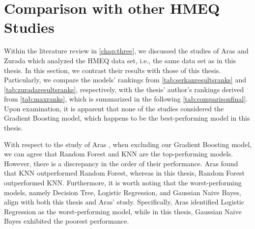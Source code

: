 \newpage
\section{Comparison with other HMEQ Studies}
\label{sec:comparisonfinal}
Within the literature review in \autoref{chap:three}, we discussed the studies of Aras \citep{serkan2021bagging} and Zurada \citep{zurada2014classification} which analyzed the HMEQ data set, i.e., the same data set as in this thesis.
In this section, we contrast their results with those of this thesis. Particularly, we compare the models' rankings from \autoref{tab:serkanresultsranks} and \autoref{tab:zuradaresultsranks}, respectively, with the thesis' author's rankings derived from \autoref{tab:maxranks}, which is summarized in the following \autoref{tab:comparisonfinal}.
Upon examination, it is apparent that none of the studies considered the Gradient Boosting model, which happens to be the best-performing model in this thesis.

With respect to the study of Aras \citep{serkan2021bagging}, when excluding our Gradient Boosting model, we can agree that Random Forest and KNN are the top-performing models. However, there is a discrepancy in the order of their performance. Aras found that KNN outperformed Random Forest, whereas in this thesis, Random Forest outperformed KNN.
Furthermore, it is worth noting that the worst-performing models, namely Decision Tree, Logistic Regression, and Gaussian Naive Bayes, align with both this thesis and Aras' study. Specifically, Aras identified Logistic Regression as the worst-performing model, while in this thesis, Gaussian Naive Bayes exhibited the poorest performance.

